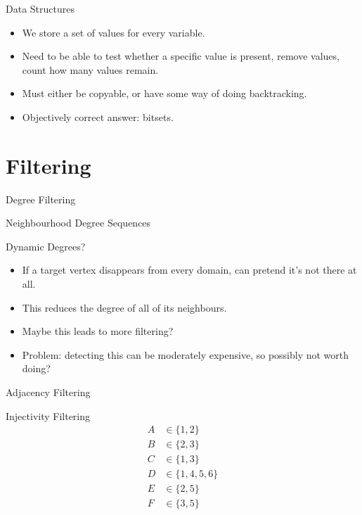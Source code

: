 \documentclass[aspectratio=169,compress,10pt]{beamer}
\begin{document}
\begin{frame}{Data Structures}
    \begin{itemize}
        \item We store a set of values for every variable.
        \item Need to be able to test whether a specific value is present, remove values,
            count how many values remain.
        \item Must either be copyable, or have some way of doing backtracking.
        \item <2-> Objectively correct answer: bitsets.
    \end{itemize}
\end{frame}

\section{Filtering}

\begin{frame}{Degree Filtering}
\end{frame}

\begin{frame}{Neighbourhood Degree Sequences}
\end{frame}

\begin{frame}{Dynamic Degrees?}
    \begin{itemize}
        \item If a target vertex disappears from every domain, can pretend it's not there at all.
        \item This reduces the degree of all of its neighbours.
        \item Maybe this leads to more filtering?
        \item <2-> Problem: detecting this can be moderately expensive, so possibly not worth doing?
    \end{itemize}
\end{frame}

\begin{frame}{Adjacency Filtering}
\end{frame}

\begin{frame}{Injectivity Filtering}
    \begin{align*}
        A &\in \{ 1, 2 \} \\
        B &\in \{ 2, 3 \} \\
        C &\in \{ 1, 3 \} \\
        D &\in \{ 1, 4, 5, 6 \} \\
        E &\in \{ 2, 5 \} \\
        F &\in \{ 3, 5 \}
    \end{align*}
\end{frame}
\end{document}
